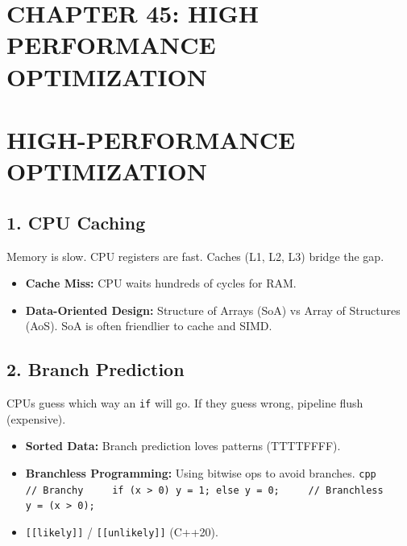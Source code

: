 \hypertarget{chapter-45-high-performance-optimization}{%
\section{CHAPTER 45: HIGH PERFORMANCE
OPTIMIZATION}\label{chapter-45-high-performance-optimization}}

\hypertarget{high-performance-optimization}{%
\section{HIGH-PERFORMANCE
OPTIMIZATION}\label{high-performance-optimization}}

\hypertarget{cpu-caching}{%
\subsection{1. CPU Caching}\label{cpu-caching}}

Memory is slow. CPU registers are fast. Caches (L1, L2, L3) bridge the
gap.

\begin{itemize}
\tightlist
\item
  \textbf{Cache Miss:} CPU waits hundreds of cycles for RAM.
\item
  \textbf{Data-Oriented Design:} Structure of Arrays (SoA) vs Array of
  Structures (AoS). SoA is often friendlier to cache and SIMD.
\end{itemize}

\hypertarget{branch-prediction}{%
\subsection{2. Branch Prediction}\label{branch-prediction}}

CPUs guess which way an \passthrough{\lstinline!if!} will go. If they
guess wrong, pipeline flush (expensive).

\begin{itemize}
\tightlist
\item
  \textbf{Sorted Data:} Branch prediction loves patterns (TTTTFFFF).
\item
  \textbf{Branchless Programming:} Using bitwise ops to avoid branches.
  \passthrough{\lstinline!cpp     // Branchy     if (x > 0) y = 1; else y = 0;     // Branchless     y = (x > 0);!}
\item
  \passthrough{\lstinline![[likely]]!} /
  \passthrough{\lstinline![[unlikely]]!} (C++20).
\end{itemize}

